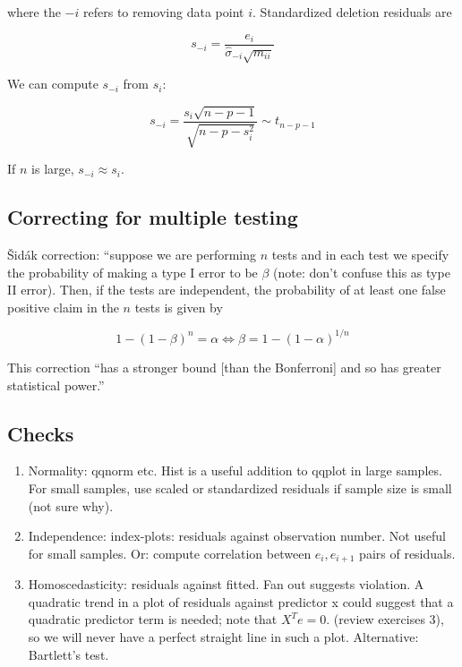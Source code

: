 \noindent
where the $-i$ refers to removing data point $i$.
Standardized deletion residuals are

\begin{equation}
s_{-i} = \frac{e_i}{\hat{\sigma}_{-i}\sqrt{m_{ii}}}
\end{equation}

We can compute $s_{-i}$ from $s_{i}$:

\begin{equation}
s_{-i} = \frac{s_i \sqrt{n-p-1}}{\sqrt{n-p-s_{i}^2}} \sim t_{n-p-1}
\end{equation}

If $n$ is large, $s_{-i}\approx s_i$. 

\subsection{Correcting for multiple testing}

\v{S}id\'ak correction: 
``suppose we are performing $n$ tests and in each test we specify the probability of making a type I error to be $\beta$ (note: don't confuse this as type II error). Then, if the tests are independent, the probability of at least one false positive claim in the $n$ tests is given by 

\begin{equation}
1-(1-\beta)^n = \alpha \Leftrightarrow \beta = 1-(1-\alpha)^{1/n}
\end{equation}

This correction ``has a stronger bound [than the Bonferroni] and so has greater statistical power.''

\subsection{Checks}

\begin{enumerate}
\item Normality: qqnorm etc. Hist is a useful addition to qqplot in large samples. For small samples, use scaled or standardized residuals if sample size is small (not sure why).
\item Independence: index-plots: residuals against observation number. Not useful for small samples. Or: compute correlation between $e_i, e_{i+1}$ pairs of residuals.
\item Homoscedasticity: residuals against fitted. Fan out suggests violation. A quadratic trend in a plot of residuals against predictor x could suggest that a quadratic predictor term is needed; note that $X^T e = 0$. (review exercises 3), so we will never have a perfect straight line in such a plot. Alternative: Bartlett's test.
\end{enumerate}

